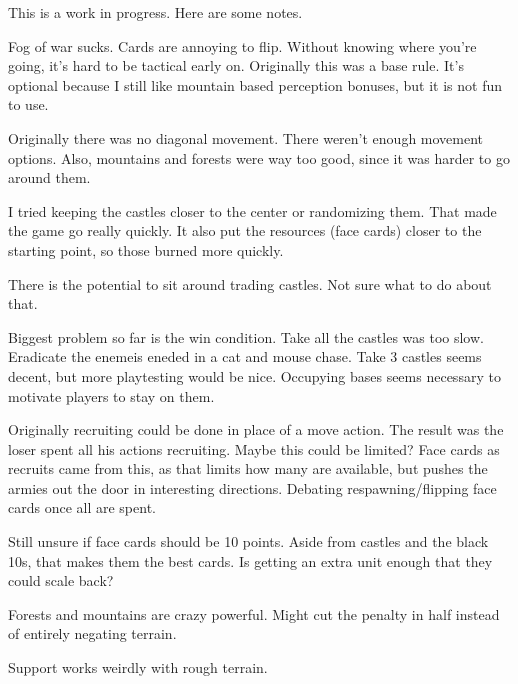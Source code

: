 \documentclass{article}
\begin{document}
This is a work in progress.  Here are some notes.

Fog of war sucks.  Cards are annoying to flip.  Without knowing where you're going, it's hard to be tactical early on.  Originally this was a base rule.  It's optional because I still like mountain based perception bonuses, but it is not fun to use.

Originally there was no diagonal movement.  There weren't enough movement options.  Also, mountains and forests were way too good, since it was harder to go around them.

I tried keeping the castles closer to the center or randomizing them.  That made the game go really quickly.  It also put the resources (face cards) closer to the starting point, so those burned more quickly.

There is the potential to sit around trading castles.  Not sure what to do about that.

Biggest problem so far is the win condition.  Take all the castles was too slow.  Eradicate the enemeis eneded in a cat and mouse chase.  Take 3 castles seems decent, but more playtesting would be nice.  Occupying bases seems necessary to motivate players to stay on them.

Originally recruiting could be done in place of a move action.  The result was the loser spent all his actions recruiting.  Maybe this could be limited?  Face cards as recruits came from this, as that limits how many are available, but pushes the armies out the door in interesting directions.  Debating respawning/flipping face cards once all are spent.

Still unsure if face cards should be 10 points.  Aside from castles and the black 10s, that makes them the best cards.  Is getting an extra unit enough that they could scale back?

Forests and mountains are crazy powerful.  Might cut the penalty in half instead of entirely negating terrain.

Support works weirdly with rough terrain.  
\end{document}
